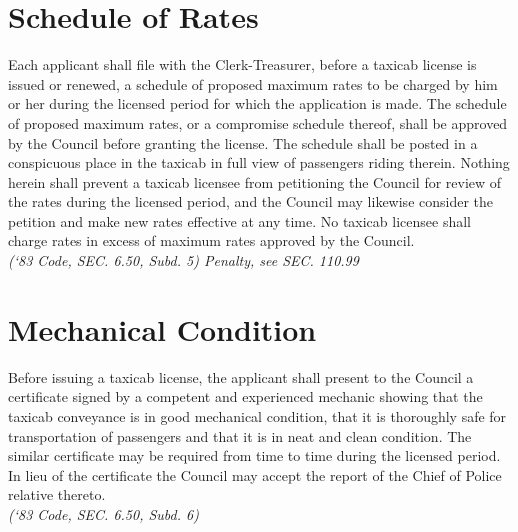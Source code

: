 \section{Schedule of Rates}
Each applicant shall file with the Clerk-Treasurer, before a taxicab license is issued or renewed, a schedule of proposed maximum rates to be charged by him or her during the licensed period for which the application is made. The schedule of proposed maximum rates, or a compromise schedule thereof, shall be approved by the Council before granting the license. The schedule shall be posted in a conspicuous place in the taxicab in full view of passengers riding therein. Nothing herein shall prevent a taxicab licensee from petitioning the Council for review of the rates during the licensed period, and the Council may likewise consider the petition and make new rates effective at any time.  No taxicab licensee shall charge rates in excess of maximum rates approved by the Council.\\
\emph{(‘83 Code, SEC. 6.50, Subd. 5)  Penalty, see SEC. 110.99}
\section{Mechanical Condition}
Before issuing a taxicab license, the applicant shall present to the Council a certificate signed by a competent and experienced mechanic showing that the taxicab conveyance is in good mechanical condition, that it is thoroughly safe for transportation of passengers and that it is in neat and clean condition.  The similar certificate may be required from time to time during the licensed period.  In lieu of the certificate the Council may accept the report of the Chief of Police relative thereto.\\
\emph{(‘83 Code, SEC. 6.50, Subd. 6)}
